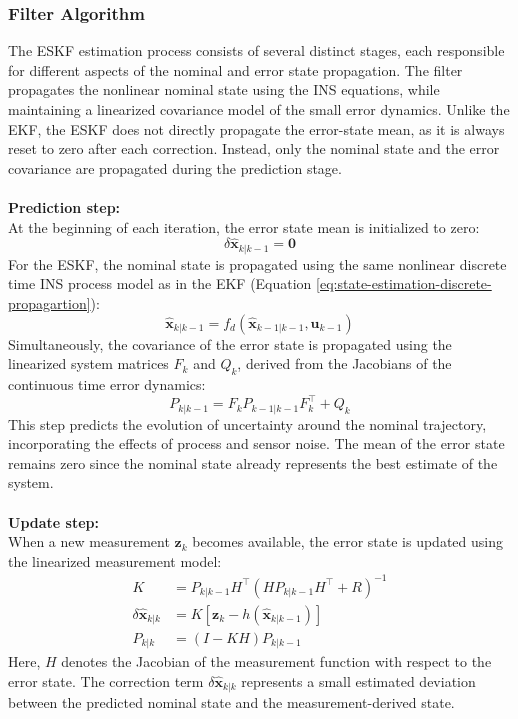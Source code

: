 \subsubsection{Filter Algorithm}
The ESKF estimation process consists of several distinct stages, each responsible for different aspects of the nominal and error state propagation. The filter propagates the nonlinear nominal state using the INS equations, while maintaining a linearized covariance model of the small error dynamics. Unlike the EKF, the ESKF does not directly propagate the error-state mean, as it is always reset to zero after each correction. Instead, only the nominal state and the error covariance are propagated during the prediction stage.
\\ \\
\textbf{Prediction step:} \\ \noindent
At the beginning of each iteration, the error state mean is initialized to zero:
$$
    \delta\hat{\mathbf{x}}_{k|k-1} = \mathbf{0}
$$
For the ESKF, the nominal state is propagated using the same nonlinear discrete time INS process model as in the EKF (Equation \ref{eq:state-estimation-discrete-propagartion}):  
$$
    \hat{\mathbf{x}}_{k|k-1} = f_d(\hat{\mathbf{x}}_{k-1|k-1}, \mathbf{u}_{k-1})
$$
Simultaneously, the covariance of the error state is propagated using the linearized system matrices $F_k$ and $Q_k$, derived from the Jacobians of the continuous time error dynamics:
$$
    P_{k|k-1} = F_k P_{k-1|k-1} F_k^\top + Q_k
$$
This step predicts the evolution of uncertainty around the nominal trajectory, incorporating the effects of process and sensor noise. The mean of the error state remains zero since the nominal state already represents the best estimate of the system.
\\ \\
\textbf{Update step:} \\ \noindent
When a new measurement $\mathbf{z}_k$ becomes available, the error state is updated using the linearized measurement model:
$$
\begin{aligned}
    K &= P_{k|k-1} H^\top (H P_{k|k-1} H^\top + R)^{-1} \\
    \delta\hat{\mathbf{x}}_{k|k} &= K [\mathbf{z}_k - h(\hat{\mathbf{x}}_{k|k-1})] \\
    P_{k|k} &= (I - K H) P_{k|k-1}
\end{aligned}
$$
Here, $H$ denotes the Jacobian of the measurement function with respect to the error state. The correction term $\delta\hat{\mathbf{x}}_{k|k}$ represents a small estimated deviation between the predicted nominal state and the measurement-derived state.
